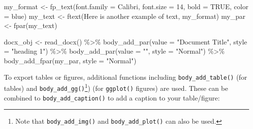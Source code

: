 \documentclass[
]{krantz}
\makeatletter
\newenvironment{Shaded}{\begin{snugshade}}{\end{snugshade}}
\newcommand{\AttributeTok}[1]{\textcolor[rgb]{0.61,0.61,0.61}{#1}}
\newcommand{\ConstantTok}[1]{\textcolor[rgb]{0,0,0}{#1}}
\newcommand{\DecValTok}[1]{\textcolor[rgb]{0.06,0.06,0.06}{#1}}
\newcommand{\FunctionTok}[1]{\textcolor[rgb]{0,0,0}{#1}}
\newcommand{\NormalTok}[1]{#1}
\newcommand{\OtherTok}[1]{\textcolor[rgb]{0.37,0.37,0.37}{#1}}
\newcommand{\SpecialCharTok}[1]{\textcolor[rgb]{0,0,0}{#1}}
\newcommand{\StringTok}[1]{\textcolor[rgb]{0.5,0.5,0.5}{#1}}
\newenvironment{kframe}{%
\medskip{}
\setlength{\fboxsep}{.8em}
 \def\at@end@of@kframe{}%
 \ifinner\ifhmode%
  \def\at@end@of@kframe{\end{minipage}}%
  \begin{minipage}{\columnwidth}%
 \fi\fi%
 \def\FrameCommand##1{\hskip\@totalleftmargin \hskip-\fboxsep
 \colorbox{shadecolor}{##1}\hskip-\fboxsep
     \hskip-\linewidth \hskip-\@totalleftmargin \hskip\columnwidth}%
 \MakeFramed {\advance\hsize-\width
   \@totalleftmargin\z@ \linewidth\hsize
   \@setminipage}}%
 {\par\unskip\endMakeFramed%
 \at@end@of@kframe}
\renewenvironment{Shaded}{\begin{kframe}}{\end{kframe}}
\makeatother
\begin{document}
\begin{Shaded}
\begin{Highlighting}[]
\NormalTok{my\_format }\OtherTok{\textless{}{-}} \FunctionTok{fp\_text}\NormalTok{(}\AttributeTok{font.family =} \StringTok{\textquotesingle{}Calibri\textquotesingle{}}\NormalTok{, }\AttributeTok{font.size =} \DecValTok{14}\NormalTok{, }\AttributeTok{bold =} \ConstantTok{TRUE}\NormalTok{, }\AttributeTok{color =} \StringTok{\textquotesingle{}blue\textquotesingle{}}\NormalTok{)}
\NormalTok{my\_text }\OtherTok{\textless{}{-}} \FunctionTok{ftext}\NormalTok{(}\StringTok{\textquotesingle{}Here is another example of text\textquotesingle{}}\NormalTok{, my\_format)}
\NormalTok{my\_par }\OtherTok{\textless{}{-}} \FunctionTok{fpar}\NormalTok{(my\_text)}

\NormalTok{docx\_obj }\OtherTok{\textless{}{-}} \FunctionTok{read\_docx}\NormalTok{() }\SpecialCharTok{\%\textgreater{}\%} 
  \FunctionTok{body\_add\_par}\NormalTok{(}\AttributeTok{value =} \StringTok{"Document Title"}\NormalTok{, }\AttributeTok{style =} \StringTok{"heading 1"}\NormalTok{) }\SpecialCharTok{\%\textgreater{}\%} 
  \FunctionTok{body\_add\_par}\NormalTok{(}\AttributeTok{value =} \StringTok{""}\NormalTok{, }\AttributeTok{style =} \StringTok{"Normal"}\NormalTok{) }\SpecialCharTok{\%\textgreater{}\%} 
  \FunctionTok{body\_add\_fpar}\NormalTok{(my\_par, }\AttributeTok{style =} \StringTok{"Normal"}\NormalTok{)}
\end{Highlighting}
\end{Shaded}

To export tables or figures, additional functions including \texttt{body\_add\_table()} (for tables) and \texttt{body\_add\_gg()}\footnote{Note that \texttt{body\_add\_img()} and \texttt{body\_add\_plot()} can also be used.}) (for \texttt{ggplot()} figures) are used. These can be combined to \texttt{body\_add\_caption()} to add a caption to your table/figure:
\end{document}
